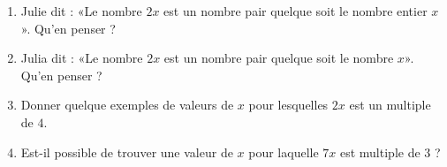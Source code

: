
\begin{exercice}\label{exosmath-0938}

    \begin{enumerate}
        \item
            Julie dit : «Le nombre \( 2x\) est un nombre pair quelque soit le nombre entier \( x\)». Qu'en penser ?
        \item
            Julia dit : «Le nombre \( 2x\) est un nombre pair quelque soit le nombre \( x\)». Qu'en penser ?
        \item        
            Donner quelque exemples de valeurs de \( x\) pour lesquelles \( 2x\) est un multiple de \( 4\).
        \item
            Est-il possible de trouver une valeur de \( x\) pour laquelle \( 7x\) est multiple de \( 3\) ?
    \end{enumerate}

\end{exercice}
